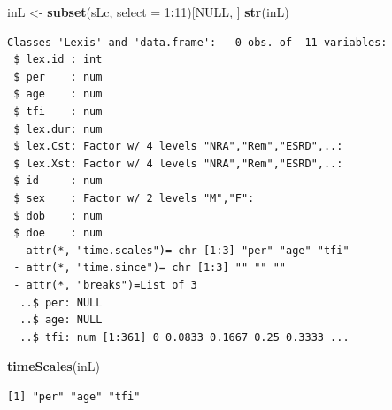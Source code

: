 \documentclass[
]{book}
\newenvironment{Shaded}{\begin{snugshade}}{\end{snugshade}}
\newcommand{\AttributeTok}[1]{\textcolor[rgb]{0.13,0.29,0.53}{#1}}
\newcommand{\ConstantTok}[1]{\textcolor[rgb]{0.56,0.35,0.01}{#1}}
\newcommand{\DecValTok}[1]{\textcolor[rgb]{0.00,0.00,0.81}{#1}}
\newcommand{\FunctionTok}[1]{\textcolor[rgb]{0.13,0.29,0.53}{\textbf{#1}}}
\newcommand{\NormalTok}[1]{#1}
\newcommand{\OtherTok}[1]{\textcolor[rgb]{0.56,0.35,0.01}{#1}}
\newcommand{\SpecialCharTok}[1]{\textcolor[rgb]{0.81,0.36,0.00}{\textbf{#1}}}
\begin{document}
\begin{enumerate}
\begin{Shaded}
\begin{Highlighting}[]
\NormalTok{inL }\OtherTok{\textless{}{-}} \FunctionTok{subset}\NormalTok{(sLc, }\AttributeTok{select =} \DecValTok{1}\SpecialCharTok{:}\DecValTok{11}\NormalTok{)[}\ConstantTok{NULL}\NormalTok{, ]}
\FunctionTok{str}\NormalTok{(inL)}
\end{Highlighting}
\end{Shaded}

\begin{verbatim}
Classes 'Lexis' and 'data.frame':   0 obs. of  11 variables:
 $ lex.id : int 
 $ per    : num 
 $ age    : num 
 $ tfi    : num 
 $ lex.dur: num 
 $ lex.Cst: Factor w/ 4 levels "NRA","Rem","ESRD",..: 
 $ lex.Xst: Factor w/ 4 levels "NRA","Rem","ESRD",..: 
 $ id     : num 
 $ sex    : Factor w/ 2 levels "M","F": 
 $ dob    : num 
 $ doe    : num 
 - attr(*, "time.scales")= chr [1:3] "per" "age" "tfi"
 - attr(*, "time.since")= chr [1:3] "" "" ""
 - attr(*, "breaks")=List of 3
  ..$ per: NULL
  ..$ age: NULL
  ..$ tfi: num [1:361] 0 0.0833 0.1667 0.25 0.3333 ...
\end{verbatim}

\begin{Shaded}
\begin{Highlighting}[]
\FunctionTok{timeScales}\NormalTok{(inL)}
\end{Highlighting}
\end{Shaded}

\begin{verbatim}
[1] "per" "age" "tfi"
\end{verbatim}


\end{enumerate}
\end{document}
